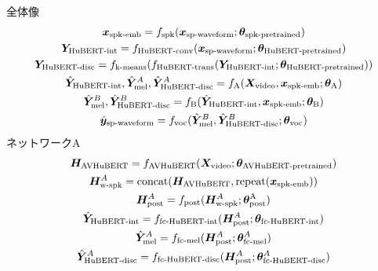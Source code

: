 \documentclass[12pt]{jarticle}
\numberwithin{equation}{section}    %
\numberwithin{figure}{section}      %
\numberwithin{table}{section}      %
\begin{document}
全体像
\begin{gather}
    \bm{x}_{\text{spk-emb}} = f_{\text{spk}}(\bm{x}_{\text{sp-waveform}}; \bm{\theta}_{\text{spk-pretrained}}) \\
    \bm{Y}_{\text{HuBERT-int}} = f_{\text{HuBERT-conv}}(\bm{x}_{\text{sp-waveform}}; \bm{\theta}_{\text{HuBERT-pretrained}}) \\
    \bm{Y}_{\text{HuBERT-disc}} = f_{\text{k-means}}(f_{\text{HuBERT-trans}}(\bm{Y}_{\text{HuBERT-int}}; \bm{\theta}_{\text{HuBERT-pretrained}})) \\
    \hat{\bm{Y}}_{\text{HuBERT-int}}, \hat{\bm{Y}}_{\text{mel}}^{A}, \hat{\bm{Y}}_{\text{HuBERT-disc}}^{A} = f_{\text{A}}(\bm{X}_{\text{video}}, \bm{x}_{\text{spk-emb}}; \bm{\theta}_{\text{A}}) \\
    \hat{\bm{Y}}_{\text{mel}}^{B}, \hat{\bm{Y}}_{\text{HuBERT-disc}}^{B} = f_{\text{B}}(\hat{\bm{Y}}_{\text{HuBERT-int}}, \bm{x}_{\text{spk-emb}}; \bm{\theta}_{\text{B}}) \\
    \hat{\bm{y}}_{\text{sp-waveform}} = f_{\text{voc}}(\hat{\bm{Y}}_{\text{mel}}^{B}, \hat{\bm{Y}}_{\text{HuBERT-disc}}^{B}; \bm{\theta}_{\text{voc}})
\end{gather}
ネットワークA
\begin{gather}
    \bm{H}_{\text{AVHuBERT}} = f_{\text{AVHuBERT}}(\bm{X}_{\text{video}}; \bm{\theta}_{\text{AVHuBERT-pretrained}}) \\
    \bm{H}_{\text{w-spk}}^{A} = \text{concat}(\bm{H}_{\text{AVHuBERT}}, \text{repeat}(\bm{x}_{\text{spk-emb}})) \\
    \bm{H}_{\text{post}}^{A} = f_{\text{post}}(\bm{H}_{\text{w-spk}}^{A}; \bm{\theta}_{\text{post}}^{\text{A}}) \\
    \hat{\bm{Y}}_{\text{HuBERT-int}} = f_{\text{fc-HuBERT-int}}(\bm{H}_{\text{post}}^{A}; \bm{\theta}_{\text{fc-HuBERT-int}}) \\
    \hat{\bm{Y}}_{\text{mel}}^{A} = f_{\text{fc-mel}}(\bm{H}_{\text{post}}^{A}; \bm{\theta}_{\text{fc-mel}}^{A}) \\
    \hat{\bm{Y}}_{\text{HuBERT-disc}}^{A} = f_{\text{fc-HuBERT-disc}}(\bm{H}_{\text{post}}^{A}; \bm{\theta}_{\text{fc-HuBERT-disc}}^{A})
\end{gather}
\end{document}
